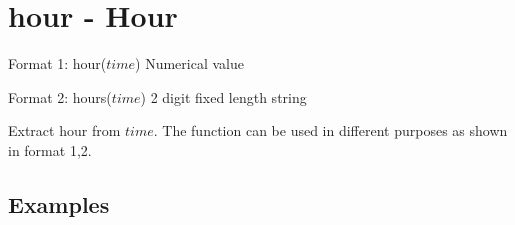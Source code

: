 
%

\section{hour - Hour\label{sect:hour}}

Format 1: hour($time$) Numerical value

Format 2: hours($time$) 2 digit fixed length string

Extract hour from $time$. The function can be used in different purposes as shown in format 1,2. 


\subsection*{Examples}


%


